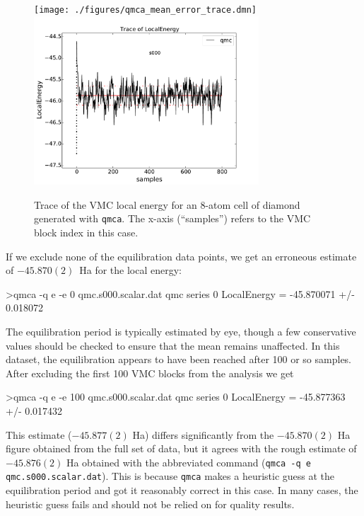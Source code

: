 \begin{figure}
\begin{center}
\ifdefined\HCode
\texttt{[image: ./figures/qmca\_mean\_error\_trace.dmn]}
\else
\includegraphics[trim = 0mm 0mm 0mm 0mm,clip,width=0.75\textwidth]{./figures/qmca_mean_error_trace.pdf}
\fi
\caption{Trace of the VMC local energy for an 8-atom cell of diamond generated with \texttt{qmca}.  The x-axis (``samples'') refers to the VMC block index in this case.}
\label{fig:qmca_mean_error_trace}
\end{center}
\end{figure}

If we exclude none of the equilibration data points, we get an 
erroneous estimate of $-45.870(2)$~Ha for the local energy:
\begin{shade}
>qmca -q e -e 0 qmc.s000.scalar.dat 
qmc  series 0  LocalEnergy           =  -45.870071 +/- 0.018072
\end{shade}
\noindent
The equilibration period is typically estimated by eye, though a few conservative values should be checked to ensure that the mean remains 
unaffected.  In this dataset, the equilibration appears to have been 
reached after 100 or so samples.  After excluding the first 100 
VMC blocks from the analysis we get
\begin{shade}
>qmca -q e -e 100 qmc.s000.scalar.dat 
qmc  series 0  LocalEnergy           =  -45.877363 +/- 0.017432
\end{shade}
\noindent
This estimate ($-45.877(2)$ Ha) differs significantly from the 
$-45.870(2)$ Ha figure obtained from the full set of data, but it 
agrees with the rough estimate of $-45.876(2)$ Ha obtained 
with the abbreviated command (\texttt{qmca -q e qmc.s000.scalar.dat}).
This is because \texttt{qmca} makes a heuristic guess at the 
equilibration period and got it reasonably correct in this case. 
In many cases, the heuristic guess fails and should not 
be relied on for quality results.

